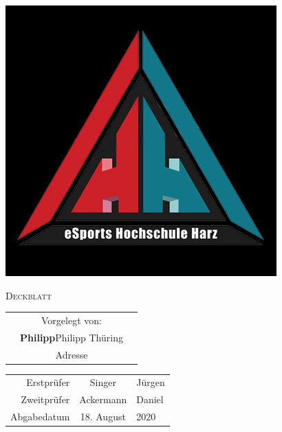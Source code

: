

    \begin{center}

        \includegraphics[width=0.5\paperwidth]{graphics/logo black.jpg}
        \vspace{20mm}

        \Huge{\textsc{Deckblatt}}
        \normalsize
    
        \vspace{20mm}
    
        \begin{tabular}{r c l}
            &Vorgelegt von:&\\
            &\textbf{Philipp}Philipp Thüring&\\
             &Adresse& \\
        \end{tabular}
    
        \vfill
        \begin{tabular}{r c l}
            Erstprüfer & Singer & Jürgen \\
            Zweitprüfer & Ackermann & Daniel \\
            Abgabedatum & 18. August & 2020 \\
        \end{tabular}
    
    
        
    
    \end{center}